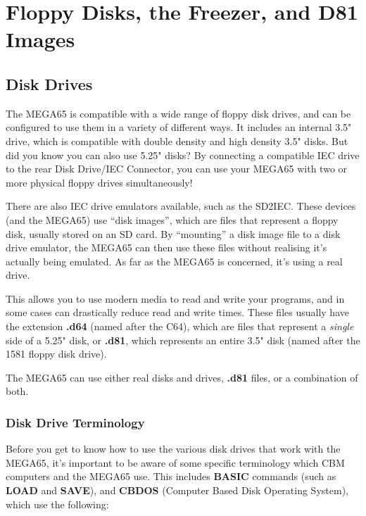 \chapter{Floppy Disks, the Freezer, and D81 Images}
\label{cha:freezer}


\section{Disk Drives}
The MEGA65 is compatible with a wide range of floppy disk drives, and can be configured to use them in a variety
of different ways. It includes an internal 3.5" drive, which is compatible with double density and high density
3.5" disks. But did you know you can also use 5.25" disks? By connecting a compatible IEC drive to the rear
Disk Drive/IEC Connector, you can use your MEGA65 with two or more physical floppy drives simultaneously!

There are also IEC drive emulators available, such as the SD2IEC. These devices
(and the MEGA65) use ``disk images'', which are files that represent a floppy disk, usually stored on an SD card.
By ``mounting'' a disk image file to a disk drive emulator, the MEGA65 can then use these files without realising it's
actually being emulated. As far as the MEGA65 is concerned, it's using a real drive.

This allows you to use modern media to read and write your programs, and in some cases can drastically reduce
read and write times. These files usually have the extension {\bf .d64} (named after the C64), which are files that
represent a {\it single} side of a 5.25" disk, or {\bf .d81}, which represents an entire 3.5" disk (named after the
1581 floppy disk drive).

The MEGA65 can use either real disks and drives, {\bf .d81} files, or a combination of both.

\subsection{Disk Drive Terminology}
Before you get to know how to use the various disk drives that work with the MEGA65, it's important to be aware
of some specific terminology which CBM computers and the MEGA65 use. This includes {\bf BASIC} commands (such as
{\bf LOAD} and {\bf SAVE}), and {\bf CBDOS} (Computer Based Disk Operating System), which use the following:

